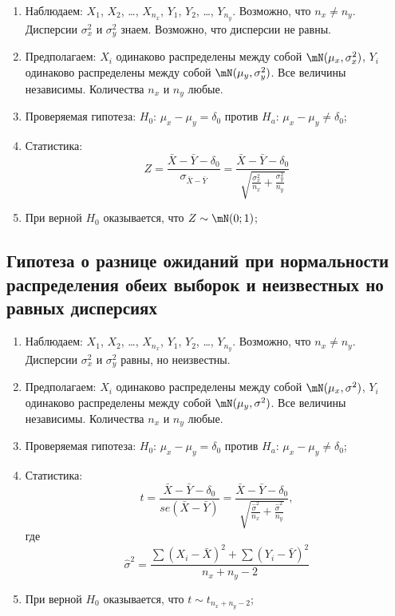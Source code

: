 \documentclass[12pt, a4paper, oneside]{article}
\begin{document}
\begin{enumerate}
    \item Наблюдаем: $X_1$, $X_2$, \ldots, $X_{n_x}$, $Y_1$, $Y_2$, \ldots, $Y_{n_y}$.
    Возможно, что $n_x \neq n_y$. Дисперсии $\sigma^2_x$ и $\sigma^2_y$ знаем. Возможно, что дисперсии не равны.
    
    \item Предполагаем: $X_i$ одинаково распределены между собой $\mN(\mu_x, \sigma^2_x)$,
    $Y_i$ одинаково распределены между собой $\mN(\mu_y, \sigma^2_y)$.
    Все величины независимы. Количества $n_x$ и $n_y$ любые.
    
    \item Проверяемая гипотеза: $H_0$: $\mu_x - \mu_y = \delta_0$ против $H_a$: $\mu_x - \mu_y \neq \delta_0$;
    
    \item Статистика:
    \[
    Z = \frac{\bar X - \bar Y - \delta_0}{\sigma_{\bar X - \bar Y}} =
    \frac{\bar X - \bar Y - \delta_0}{\sqrt{\frac{\sigma^2_x}{n_x}+\frac{\sigma^2_y}{n_y}}}
    \]

    \item При верной $H_0$ оказывается, что $Z \sim \mN(0;1)$;
\end{enumerate}


\subsection*{Гипотеза о разнице ожиданий при нормальности распределения обеих выборок и неизвестных но равных дисперсиях}

\begin{enumerate}
    \item Наблюдаем: $X_1$, $X_2$, \ldots, $X_{n_x}$, $Y_1$, $Y_2$, \ldots, $Y_{n_y}$.
    Возможно, что $n_x \neq n_y$. Дисперсии $\sigma^2_x$ и $\sigma^2_y$ равны, но неизвестны.
    
    \item Предполагаем: $X_i$ одинаково распределены между собой $\mN(\mu_x, \sigma^2)$,
    $Y_i$ одинаково распределены между собой $\mN(\mu_y, \sigma^2)$.
    Все величины независимы. Количества $n_x$ и $n_y$ любые.
    
    \item Проверяемая гипотеза: $H_0$: $\mu_x - \mu_y = \delta_0$ против $H_a$: $\mu_x - \mu_y \neq \delta_0$;
    
    \item Статистика:
    \[
    t = \frac{\bar X - \bar Y - \delta_0}{se(\bar X - \bar Y)} =
    \frac{\bar X - \bar Y - \delta_0}{\sqrt{\frac{\hat \sigma^2}{n_x}+\frac{\hat\sigma^2}{n_y}}},
    \]
    где
    \[
    \hat \sigma^2 = \frac{\sum (X_i - \bar X)^2 + \sum (Y_i - \bar Y)^2 }{n_x + n_y - 2}
    \]
    
    \item При верной $H_0$ оказывается, что $t \sim t_{n_x+n_y-2}$;
\end{enumerate}
\end{document}
